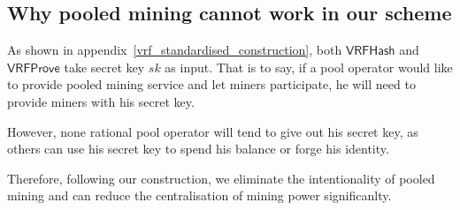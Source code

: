 \subsection{Why pooled mining cannot work in our scheme}

As shown in appendix~\ref{vrf_standardised_construction}, both $\mathsf{VRFHash}$ and $\mathsf{VRFProve}$ take secret key $sk$ as input.
That is to say, if a pool operator would like to provide pooled mining service and let miners participate, he will need to provide miners with his secret key.

However, none rational pool operator will tend to give out his secret key, as others can use his secret key to spend his balance or forge his identity.

Therefore, following our construction, we eliminate the intentionality of pooled mining and can reduce the centralisation of mining power significanlty.
